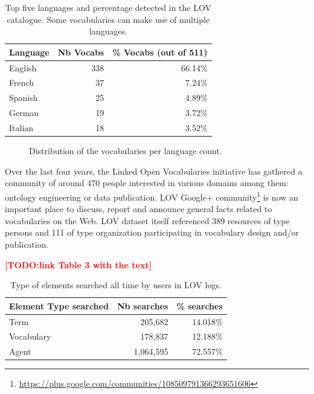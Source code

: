 \documentclass{iosart2c}
\newcommand{\TODO}[1]{\textcolor{red}{\textbf{[TODO:#1]}}}
\begin{document}
 \begin{table}[h!tb]
\caption{Top five languages and percentage detected in the LOV catalogue. Some vocabularies can make use of multiple languages.}
\begin{tabular}{lrr}
\hline
\textbf{Language} & \textbf{Nb Vocabs} & \textbf{\% Vocabs (out of 511)}  \\ \hline
English & 338 & 66.14\%      \\
French & 37 & 7.24\%      \\
Spanish & 25 & 4.89\%      \\
German & 19 & 3.72\%      \\
Italian & 18 & 3.52\%      \\
\hline  
\end{tabular}
\label{tab:language}
\end{table}

\begin{figure}[htb]

\caption{\label{fig:langdist} Distribution of the vocabularies per language count.}
\end{figure}

Over the last four years, the Linked Open Vocabularies initiative has gathered a community of around 470 people interested in various domains among them: ontology engineering or data publication. LOV Google+ community\footnote{\url{https://plus.google.com/communities/108509791366293651606}} is now an important place to discuss, report and announce general facts related to vocabularies on the Web. LOV dataset itself referenced 389 resources of type persons and 111 of type organization participating in vocabulary design and/or publication.

\TODO{link Table 3 with the text}
 \begin{table}[h!tb]
\caption{Type of elements searched all time by users in LOV logs.}
\begin{tabular}{lrr}
\hline
\textbf{Element Type searched} & \textbf{Nb searches} & \textbf{\% searches} \\ \hline
Term & 205,682 & 14.018\% \\
Vocabulary & 178,837 & 12.188\% \\
Agent & 1,064,595 & 72.557\% \\
\hline  
\end{tabular}
\label{tab:searchcategory}
\end{table}
\end{document}
